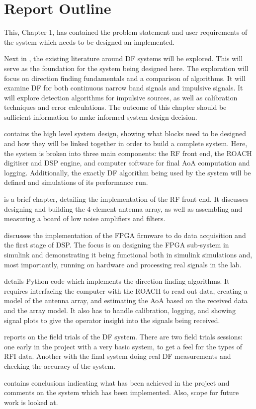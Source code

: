 \section{Report Outline}
This, Chapter 1, has contained the problem statement and user requirements of the system which needs to be designed an implemented. 

Next in , the existing literature around DF systems will be explored. This will serve as the foundation for the system being designed here. The exploration will focus on direction finding fundamentals and a comparison of algorithms. It will examine DF for both continuous narrow band signals and impulsive signals. It will explore detection algorithms for impulsive sources, as well as calibration techniques and error calculations. The outcome of this chapter should be sufficient information to make informed system design decision.

 contains the high level system design, showing what blocks need to be designed and how they will be linked together in order to build a complete system. Here, the system is broken into three main components: the RF front end, the ROACH digitiser and DSP engine, and computer software for final AoA computation and logging. Additionally, the exactly DF algorithm being used by the system will be defined and simulations of its performance run.

 is a brief chapter, detailing the implementation of the RF front end. It discusses designing and building the 4-element antenna array, as well as assembling and measuring a board of low noise amplifiers and filters.

 discusses the implementation of the FPGA firmware to do data acquisition and the first stage of DSP. The focus is on designing the FPGA sub-system in simulink and demonstrating it being functional both in simulink simulations and, most importantly, running on hardware and processing real signals in the lab.

 details Python code which implements the direction finding algorithms. It requires interfacing the computer with the ROACH to read out data, creating a model of the antenna array, and estimating the AoA based on the received data and the array model. It also has to handle calibration, logging, and showing signal plots to give the operator insight into the signals being received.

 reports on the field trials of the DF system. There are two field trials sessions: one early in the project with a very basic system, to get a feel for the types of RFI data. Another with the final system doing real DF measurements and checking the accuracy of the system.

 contains conclusions indicating what has been achieved in the project and comments on the system which has been implemented. Also, scope for future work is looked at.
